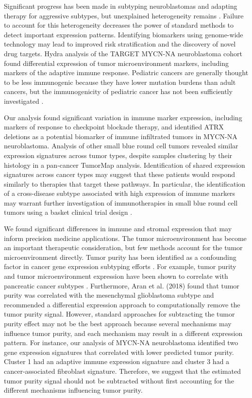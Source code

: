\documentclass[10pt,letterpaper]{article}
\begin{document}
Significant progress has been made in subtyping neuroblastomas and adapting therapy for aggressive subtypes, but unexplained heterogeneity remains \cite{morgensternChallengeDefiningUltrahighrisk2019}. Failure to account for this heterogeneity decreases the power of standard methods to detect important expression patterns. Identifying biomarkers using genome-wide technology may lead to improved risk stratification and the discovery of novel drug targets. Hydra analysis of the TARGET MYCN-NA neuroblastoma cohort found differential expression of tumor microenvironment markers, including markers of the adaptive immune response. Pediatric cancers are generally thought to be less immunogenic because they have lower mutation burdens than adult cancers, but the immunogenicity of pediatric cancer has not been sufficiently investigated \cite{majzner2017harnessing, zamoraPediatricPatientsAcute2019}.

Our analysis found significant variation in immune marker expression, including markers of response to checkpoint blockade therapy, and identified ATRX deletions as a potential biomarker of immune infiltrated tumors in MYCN-NA neuroblastoma. Analysis of other small blue round cell tumors revealed similar expression signatures across tumor types, despite samples clustering by their histology in a pan-cancer TumorMap analysis. Identification of shared expression signatures across cancer types may suggest that these patients would respond similarly to therapies that target these pathways. In particular, the identification of a cross-disease subtype associated with high expression of immune markers may warrant further investigation of immunotherapies in small blue round cell tumors using a basket clinical trial design \cite{cunananEfficientBasketTrial2017}.

We found significant differences in immune and stromal expression that may inform precision medicine applications. The tumor microenvironment has become an important therapeutic consideration, but few methods account for the tumor microenvironment directly. Tumor purity has been identified as a confounding factor in cancer gene expression subtyping efforts \cite{rheeImpactTumorPurity2018}. For example, tumor purity and tumor microenvironment expression have been shown to correlate with pancreatic cancer subtypes \cite{raphael2017integrated}. Furthermore, Aran et al. (2018) found that tumor purity was correlated with the mesenchymal glioblastoma subtype and recommended a differential expression approach to computationally remove the tumor purity signal. However, standard approaches for subtracting the tumor purity effect may not be the best approach because several mechanisms may influence tumor purity, and each mechanism may result in a different expression pattern. For instance, our analysis of MYCN-NA neuroblastoma identified two gene expression signatures that correlated with lower predicted tumor purity. Cluster 1 had an adaptive immune expression signature and cluster 3 had a cancer-associated fibroblast signature. Therefore, we suggest that the estimated tumor purity signal should not be subtracted without first accounting for the different mechanisms influencing tumor purity.
\end{document}
